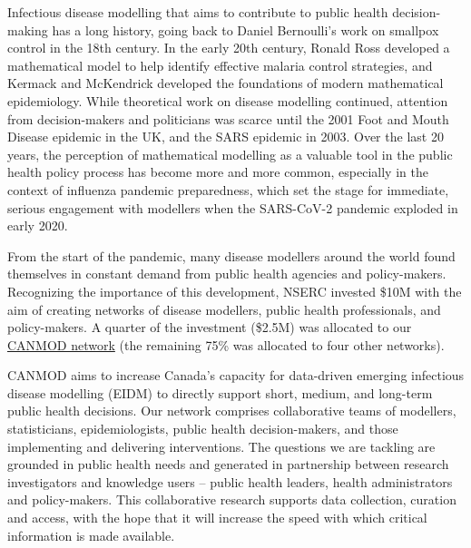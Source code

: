 
Infectious disease modelling that aims to contribute to public health
decision-making has a long history, going back to Daniel Bernoulli’s
work on smallpox control in the 18th century.  In the early 20th
century, Ronald Ross developed a mathematical model to help identify
effective malaria control strategies, and Kermack and McKendrick
developed the foundations of modern mathematical epidemiology.  While
theoretical work on disease modelling continued, attention from
decision-makers and politicians was scarce until the 2001 Foot and
Mouth Disease epidemic in the UK, and the SARS epidemic in 2003.  Over
the last 20 years, the perception of mathematical modelling as a
valuable tool in the public health policy process has become more and
more common, especially in the context of influenza pandemic
preparedness, which set the stage for immediate, serious engagement
with modellers when the SARS-CoV-2 pandemic exploded in early 2020.

From the start of the pandemic, many disease modellers around the
world found themselves in constant demand from public health agencies
and policy-makers.  Recognizing the importance of this development,
NSERC invested \$10M with the aim of creating networks of disease
modellers, public health professionals, and policy-makers.  A quarter of
the investment (\$2.5M) was allocated to our
\href{https://canmod.net/}{CANMOD network} (the remaining 75\% was
allocated to four other networks).

CANMOD aims to increase Canada’s capacity for data-driven emerging
infectious disease modelling (EIDM) to directly support short, medium,
and long-term public health decisions. Our network comprises
collaborative teams of modellers, statisticians, epidemiologists,
public health decision-makers, and those implementing and delivering
interventions. The questions we are tackling are grounded in public
health needs and generated in partnership between research
investigators and knowledge users -- public health leaders, health
administrators and policy-makers. This collaborative research supports
data collection, curation and access, with the hope that it will
increase the speed with which critical information is made available.


